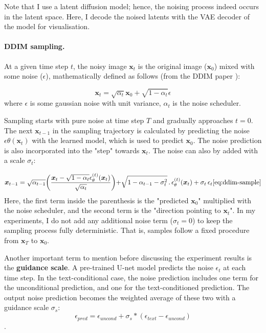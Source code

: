 Note that I use a latent diffusion model; hence, the noising process indeed occurs in the latent space. Here, I decode the noised latents with the VAE decoder of the model for visualisation. 

\paragraph{DDIM sampling.}
At a given time step $t$, the noisy image $\bm{x}_t$ is the original image ($\bm{x}_0$) mixed with some noise ($\epsilon$), mathematically defined as follows (from the DDIM paper \cite{song2020denoising}):

\begin{equation}
\bm{x}_t = \sqrt{\alpha_t}\bm{x}_0 + \sqrt{1 - \alpha_t}\epsilon
\end{equation}
where $\epsilon$ is some gaussian noise with unit variance, $\alpha_t$ is the noise scheduler. 

Sampling starts with pure noise at time step $T$ and gradually approaches $t = 0$. The next $\bm{x}_{t-1}$ in the sampling trajectory is calculated by predicting the noise $\epsilon\theta(\bm{x}_t)$ with the learned model, which is used to predict $\bm{x}_0$. The noise prediction is also incorporated into the "step" towards $\bm{x}_t$. The noise can also by added with a scale $\sigma_t$:

\begin{equation}
\bm{x}_{t -1} = \sqrt{\alpha_{t - 1}}\biggl(\frac{\bm{x}_t - \sqrt{1 - \alpha_t}\epsilon_{\theta}^{(t)}(\bm{x}_t)}{\sqrt{\alpha_t}}\biggl) + \sqrt{1 - \alpha_{t - 1} - \sigma_t^2} \, . \, \epsilon_{\theta}^{(t)}(\bm{x}_t) + \sigma_t \, \epsilon_t
\ref{eq:ddim-sample}
\end{equation}
Here, the first term inside the parenthesis is the "predicted $\bm{x}_0$" multiplied with the noise scheduler, and the second term is the "direction pointing to $\bm{x}_t$". In my experiments, I do not add any additional noise term ($\sigma_t = 0$) to keep the sampling process fully deterministic. That is, samples follow a fixed procedure from $\bm{x}_T$ to $\bm{x}_0$.

Another important term to mention before discussing the experiment results is the \textbf{guidance scale}. A pre-trained U-net model predicts the noise $\epsilon_t$ at each time step. In the text-conditional case, the noise prediction includes one term for the unconditional prediction, and one for the text-conditioned prediction. The output noise prediction becomes the weighted average of these two with a guidance scale $\sigma_s$:
$$\epsilon_{pred} = \epsilon_{uncond} + \sigma_s * (\epsilon_{text} - \epsilon_{uncond} )$$.

